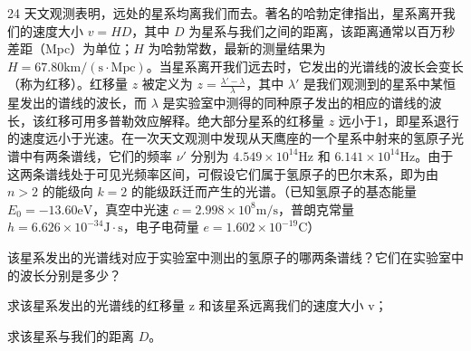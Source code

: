 \begin{problem}[第31届全国中学生物理竞赛复赛][哈勃定律与红移]{24}
天文观测表明，远处的星系均离我们而去。著名的哈勃定律指出，星系离开我们的速度大小 $v = HD$，其中 $D$ 为星系与我们之间的距离，该距离通常以百万秒差距（Mpc）为单位；$H$ 为哈勃常数，最新的测量结果为 $H = 67.80\mathrm{km/(s\cdot Mpc)}$。当星系离开我们远去时，它发出的光谱线的波长会变长（称为红移）。红移量 $z$ 被定义为 $z = \frac{\lambda' - \lambda}{\lambda}$，其中 $\lambda'$ 是我们观测到的星系中某恒星发出的谱线的波长，而 $\lambda$ 是实验室中测得的同种原子发出的相应的谱线的波长，该红移可用多普勒效应解释。绝大部分星系的红移量 $z$ 远小于1，即星系退行的速度远小于光速。在一次天文观测中发现从天鹰座的一个星系中射来的氢原子光谱中有两条谱线，它们的频率 $\nu'$ 分别为 $4.549\times 10^{14}\mathrm{Hz}$ 和 $6.141\times 10^{14}\mathrm{Hz}$。由于这两条谱线处于可见光频率区间，可假设它们属于氢原子的巴尔末系，即为由 $n > 2$ 的能级向 $k = 2$ 的能级跃迁而产生的光谱。（已知氢原子的基态能量 $E_0 = -13.60\mathrm{eV}$，真空中光速 $c = 2.998\times 10^{8}\mathrm{m/s}$，普朗克常量 $h = 6.626\times 10^{-34}\mathrm{J}\cdot\mathrm{s}$，电子电荷量 $e = 1.602\times 10^{-19}\mathrm{C}$）
    \begin{subproblem}
        该星系发出的光谱线对应于实验室中测出的氢原子的哪两条谱线？它们在实验室中的波长分别是多少？
    \end{subproblem}
    \begin{subproblem}
        求该星系发出的光谱线的红移量 z 和该星系远离我们的速度大小 v；
    \end{subproblem}
    \begin{subproblem}
        求该星系与我们的距离 $D$。
    \end{subproblem}
\end{problem}